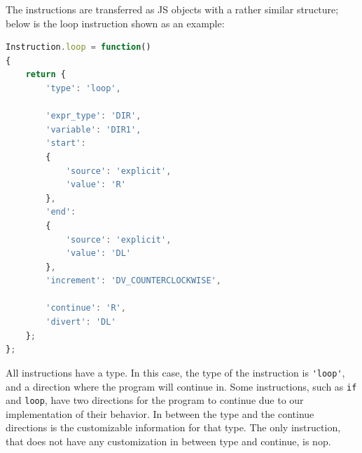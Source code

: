 The instructions are transferred as JS objects with a rather similar structure; below is the loop instruction shown as an example:

\begin{lstlisting}[language=javascript]
Instruction.loop = function()
{
	return {
		'type': 'loop',

		'expr_type': 'DIR',
		'variable': 'DIR1',
		'start':
		{
			'source': 'explicit',
			'value': 'R'
		},
		'end':
		{
			'source': 'explicit',
			'value': 'DL'
		},
		'increment': 'DV_COUNTERCLOCKWISE',
		
		'continue': 'R',
		'divert': 'DL'
	};
};
\end{lstlisting}

All instructions have a type.
In this case, the type of the instruction is \verb|'loop'|, and a direction where the program will continue in.
Some instructions, such as \verb|if| and \verb|loop|, have two directions for the program to continue due to our implementation of their behavior.
In between the type and the continue directions is the customizable information for that type.
The only instruction, that does not have any customization in between type and continue, is nop.
